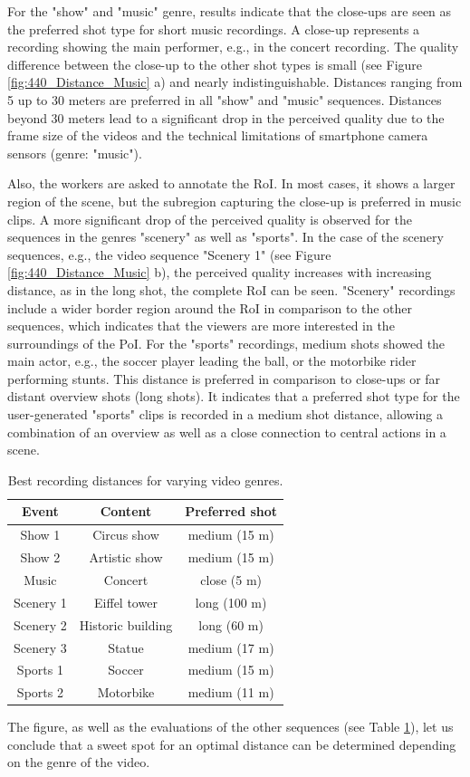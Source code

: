 For the "show" and "music" genre, results indicate that the close-ups are seen as the preferred shot type for short music recordings.
A close-up represents a recording showing the main performer, e.g., in the concert recording. 
The quality difference between the close-up to the other shot types is small (see Figure \ref{fig:440_Distance_Music} a) and nearly indistinguishable. 
Distances ranging from 5 up to 30 meters are preferred in all "show" and "music" sequences. 
Distances beyond 30 meters lead to a significant drop in the perceived quality due to the frame size of the videos and the technical limitations of smartphone camera sensors (genre: "music").

Also, the workers are asked to annotate the \ac{RoI}. 
In most cases, it shows a larger region of the scene, but the subregion capturing the close-up is preferred in music clips.
A more significant drop of the perceived quality is observed for the sequences in the genres "scenery" as well as "sports". 
In the case of the scenery sequences, e.g., the video sequence "Scenery 1" (see Figure \ref{fig:440_Distance_Music} b), the perceived quality increases with increasing distance, as in the long shot, the complete \ac{RoI} can be seen.
"Scenery" recordings include a wider border region around the \ac{RoI} in comparison to the other sequences, which indicates that the viewers are more interested in the surroundings of the \ac{PoI}. 
For the "sports" recordings, medium shots showed the main actor, e.g., the soccer player leading the ball, or the motorbike rider performing stunts.
This distance is preferred in comparison to close-ups or far distant overview shots (long shots). 
It indicates that a preferred shot type for the user-generated "sports" clips is recorded in a medium shot distance, allowing a combination of an overview as well as a close connection to central actions in a scene.
\begin{table}[htb]
\centering 
\caption{Best recording distances for varying video genres.}
\begin{tabular}{ccc}
\toprule
 Event & Content  & Preferred shot \\ 
\midrule
  Show 1 & Circus show & medium (15 m) \\ 
  Show 2 & Artistic show & medium (15 m) \\
  Music & Concert & close (5 m)  \\  
  Scenery 1 & Eiffel tower & long (100 m)  \\ 
  Scenery 2 & Historic building & long (60 m)  \\ 
  Scenery 3 & Statue & medium (17 m) \\ 
  Sports 1 & Soccer & medium (15 m)  \\ 
  Sports 2 & Motorbike & medium (11 m) \\ 
\bottomrule
\end{tabular} 
\label{tab:440_sequences}
\end{table}
The figure, as well as the evaluations of the other sequences (see Table \ref{tab:440_sequences}), let us conclude that a sweet spot for an optimal distance can be determined depending on the genre of the video. 

